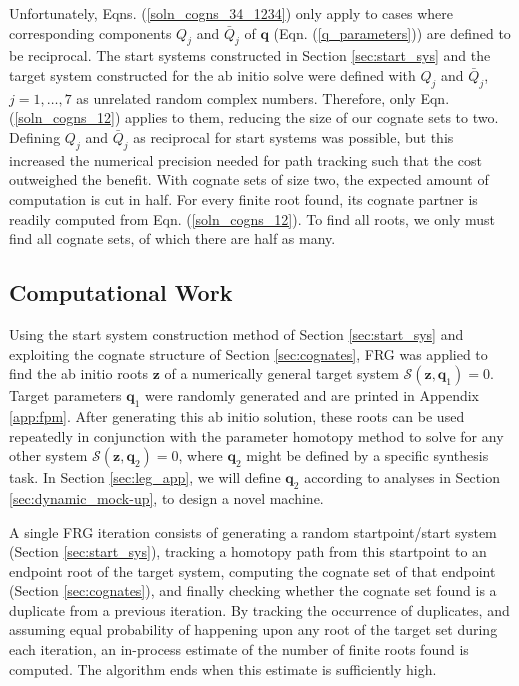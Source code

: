 \documentclass[journal]{IEEEtran}
\def\*#1{\bar{#1}} %
\begin{document}
Unfortunately, Eqns. (\ref{soln_cogns_34_1234}) only apply to cases where corresponding components $Q_j$ and $\*Q_j$ of $\mathbf{q}$ (Eqn. (\ref{q_parameters})) are defined to be reciprocal.
The start systems constructed in Section \ref{sec:start_sys} and the target system constructed for the ab initio solve were defined with $Q_j$ and $\*Q_j$, $j=1,\ldots,7$ as unrelated random complex numbers.
Therefore, only Eqn. (\ref{soln_cogns_12}) applies to them, reducing the size of our cognate sets to two.
Defining $Q_j$ and $\*Q_j$ as reciprocal for start systems was possible, but this increased the numerical precision needed for path tracking such that the cost outweighed the benefit.
With cognate sets of size two, the expected amount of computation is cut in half.
For every finite root found, its cognate partner is readily computed from Eqn. (\ref{soln_cogns_12}).
To find all roots, we only must find all cognate sets, of which there are half as many.


\subsection{Computational Work}
\label{sec:computations}

Using the start system construction method of Section \ref{sec:start_sys} and exploiting the cognate structure of Section \ref{sec:cognates}, FRG was applied to find the ab initio roots $\mathbf{z}$ of a numerically general target system $\mathcal{S}(\mathbf{z},\mathbf{q}_1)=0$.
Target parameters $\mathbf{q}_1$ were randomly generated and are printed in Appendix \ref{app:fpm}.
After generating this ab initio solution, these roots can be used repeatedly in conjunction  with the parameter homotopy method to solve for any other system $\mathcal{S}(\mathbf{z},\mathbf{q}_2)=0$, where $\mathbf{q}_2$ might be defined by a specific synthesis task.
In Section \ref{sec:leg_app}, we will define $\mathbf{q}_2$ according to analyses in Section \ref{sec:dynamic_mock-up}, to design a novel machine.



A single FRG iteration consists of generating a random startpoint/start system (Section \ref{sec:start_sys}), tracking a homotopy path from this startpoint to an endpoint root of the target system, computing the cognate set of that endpoint (Section \ref{sec:cognates}), and finally checking whether the cognate set found is a duplicate from a previous iteration.
By tracking the occurrence of duplicates, and assuming equal probability of happening upon any root of the target set during each iteration, an in-process estimate of the number of finite roots found is computed.
The algorithm ends when this estimate is sufficiently high.
\end{document}
